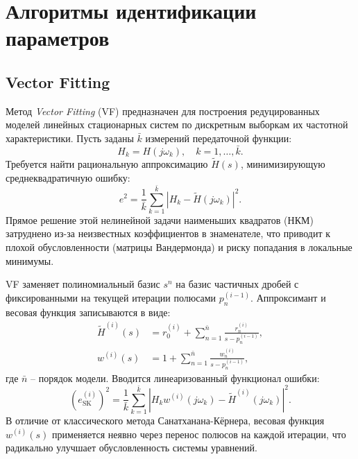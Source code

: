 \section{Алгоритмы идентификации параметров}

\subsection{Vector Fitting}

Метод \textit{Vector Fitting} (VF) \cite{triverio2019vector} предназначен для построения редуцированных моделей линейных стационарных систем по дискретным выборкам их частотной характеристики. 
Пусть заданы $\bar{k}$ измерений передаточной функции:
\begin{equation}
    H_k = H(j\omega_k), \quad k=1,\dots,\bar{k}.
\end{equation}
Требуется найти рациональную аппроксимацию $\tilde{H}(s)$, минимизирующую среднеквадратичную ошибку:
\begin{equation}
    e^2 = \frac{1}{\bar{k}} \sum_{k=1}^{\bar{k}} \left| H_k - \tilde{H}(j\omega_k) \right|^2.
\end{equation}
Прямое решение этой нелинейной задачи наименьших квадратов (НКМ) затруднено из-за неизвестных коэффициентов в знаменателе, что приводит к плохой обусловленности (матрицы Вандермонда) и риску попадания в локальные минимумы.

VF заменяет полиномиальный базис $s^n$ на базис частичных дробей с фиксированными на текущей итерации полюсами $p_n^{(i-1)}$. Аппроксимант и весовая функция записываются в виде:
\begin{align}
    \tilde{H}^{(i)}(s) &= r_0^{(i)} + \sum_{n=1}^{\bar{n}} \frac{r_n^{(i)}}{s - p_n^{(i-1)}}, \\
    w^{(i)}(s) &= 1 + \sum_{n=1}^{\bar{n}} \frac{w_n^{(i)}}{s - p_n^{(i-1)}},
\end{align}
где $\bar{n}$ -- порядок модели. Вводится линеаризованный функционал ошибки:
\begin{equation}
    (e_{\text{SK}}^{(i)})^2 = \frac{1}{\bar{k}} \sum_{k=1}^{\bar{k}} \left| H_k w^{(i)}(j\omega_k) - \tilde{H}^{(i)}(j\omega_k) \right|^2.
\end{equation}
В отличие от классического метода Санатханана-Кёрнера, весовая функция $w^{(i)}(s)$ применяется неявно через перенос полюсов на каждой итерации, что радикально улучшает обусловленность системы уравнений.

